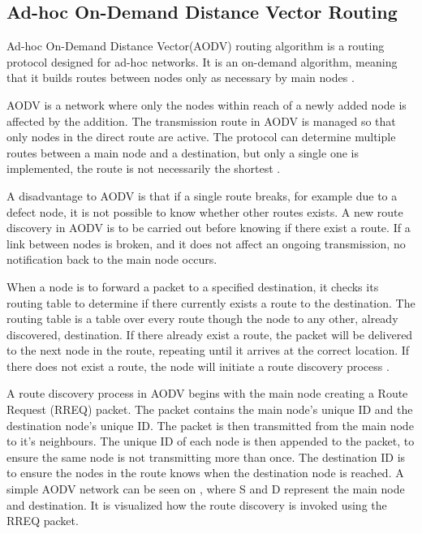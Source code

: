 \subsection{Ad-hoc On-Demand Distance Vector Routing}\label{cha:AOVD1}
Ad-hoc On-Demand Distance Vector(AODV) routing algorithm is a routing protocol designed for ad-hoc networks. 
It is an on-demand algorithm, meaning that it builds routes between nodes only as necessary by main nodes \cite{AOVD1}.

AODV is a network where only the nodes within reach of a newly added node is affected by the addition.
The transmission route in AODV is managed so that only nodes in the direct route are active.
The protocol can determine multiple routes between a main node and a destination, but only a single one is implemented, the route is not necessarily the shortest \cite{AOVD1}.

A disadvantage to AODV is that if a single route breaks, for example due to a defect node, it is not possible to know whether other routes exists.
A new route discovery in AODV is to be carried out before knowing if there exist a route.
If a link between nodes is broken, and it does not affect an ongoing transmission, no notification back to the main node occurs.

When a node is to forward a packet to a specified destination, it checks its routing table to determine if there currently exists a route to the destination.
The routing table is a table over every route though the node to any other, already discovered, destination.
If there already exist a route, the packet will be delivered to the next node in the route, repeating until it arrives at the correct location.
If there does not exist a route, the node will initiate a route discovery process \cite{AOVD1}.

A route discovery process in AODV begins with the main node creating a Route Request (RREQ) packet.
The packet contains the main node's unique ID and the destination node's unique ID.
The packet is then transmitted from the main node to it's neighbours.
The unique ID of each node is then appended to the packet, to ensure the same node is not transmitting more than once.
The destination ID is to ensure the nodes in the route knows when the destination node is reached.
A simple AODV network can be seen on , where S and D represent the main node and destination. It is visualized how the route discovery is invoked using the RREQ packet.\cite{AOVD2}

